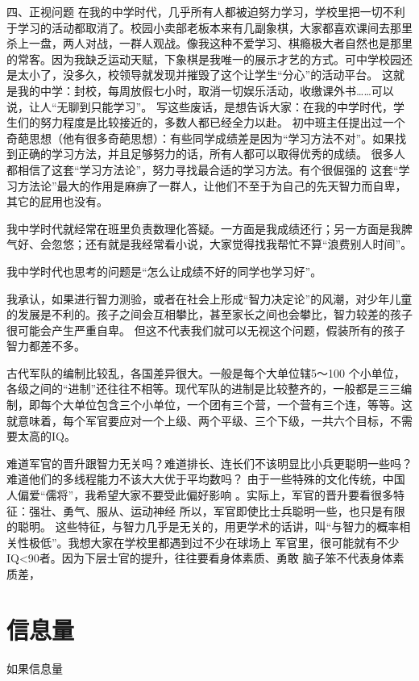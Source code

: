 四、正视问题
在我的中学时代，几乎所有人都被迫努力学习，学校里把一切不利于学习的活动都取消了。校园小卖部老板本来有几副象棋，大家都喜欢课间去那里杀上一盘，两人对战，一群人观战。像我这种不爱学习、棋瘾极大者自然也是那里的常客。因为我缺乏运动天赋，下象棋是我唯一的展示才艺的方式。可中学校园还是太小了，没多久，校领导就发现并摧毁了这个让学生“分心”的活动平台。
这就是我的中学：封校，每周放假七小时，取消一切娱乐活动，收缴课外书……可以说，让人“无聊到只能学习”。
写这些废话，是想告诉大家：在我的中学时代，学生们的努力程度是比较接近的，多数人都已经全力以赴。
初中班主任提出过一个奇葩思想（他有很多奇葩思想）：有些同学成绩差是因为“学习方法不对”。如果找到正确的学习方法，并且足够努力的话，所有人都可以取得优秀的成绩。
很多人都相信了这套“学习方法论”，努力寻找最合适的学习方法。有个很倔强的
这套“学习方法论”最大的作用是麻痹了一群人，让他们不至于为自己的先天智力而自卑，其它的屁用也没有。

我中学时代就经常在班里负责数理化答疑。一方面是我成绩还行；另一方面是我脾气好、会忽悠；还有就是我经常看小说，大家觉得找我帮忙不算“浪费别人时间”。

我中学时代也思考的问题是“怎么让成绩不好的同学也学习好”。

我承认，如果进行智力测验，或者在社会上形成“智力决定论”的风潮，对少年儿童的发展是不利的。孩子之间会互相攀比，甚至家长之间也会攀比，智力较差的孩子很可能会产生严重自卑。
但这不代表我们就可以无视这个问题，假装所有的孩子智力都差不多。

古代军队的编制比较乱，各国差异很大。一般是每个大单位辖5～100 个小单位，各级之间的“进制”还往往不相等。现代军队的进制是比较整齐的，一般都是三三编制，即每个大单位包含三个小单位，一个团有三个营，一个营有三个连，等等。这就意味着，每个军官要应对一个上级、两个平级、三个下级，一共六个目标，不需要太高的IQ。


难道军官的晋升跟智力无关吗？难道排长、连长们不该明显比小兵更聪明一些吗？难道他们的多线程能力不该大大优于平均数吗？
由于一些特殊的文化传统，中国人偏爱“儒将”，我希望大家不要受此偏好影响 。实际上，军官的晋升要看很多特征：强壮、勇气、服从、运动神经
所以，军官即使比士兵聪明一些，也只是有限的聪明。
这些特征，与智力几乎是无关的，用更学术的话讲，叫“与智力的概率相关性极低”。我想大家在学校里都遇到过不少在球场上
军官里，很可能就有不少IQ<90者。因为下层士官的提升，往往要看身体素质、勇敢
脑子笨不代表身体素质差，

\section{信息量}
如果信息量



